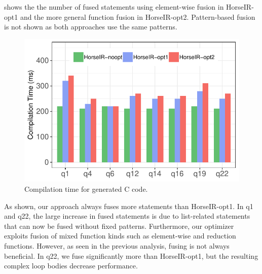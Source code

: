  shows the the number of fused statements using
element-wise fusion in HorseIR-opt1 and the more general function fusion in
HorseIR-opt2. Pattern-based fusion is not shown as both approaches use the
same patterns. 

\begin{figure}[htbp]
\centering
\includegraphics[width=.8\columnwidth]{./src/figure/compile-time.pdf}
\vspace{-3mm}
\caption{Compilation time for generated C code.}
\label{fig:compilation_time}
\end{figure}


As shown, our approach always fuses more statements than HorseIR-opt1.
In q1 and q22, the large increase in fused statements is due to list-related
statements that can now be fused without fixed patterns. Furthermore, our optimizer
exploits fusion of mixed function kinds such as element-wise and reduction functions.
However, as seen in the previous analysis, fusing is not always beneficial. In q22,
we fuse significantly more than HorseIR-opt1, but the resulting complex loop
bodies decrease performance.




